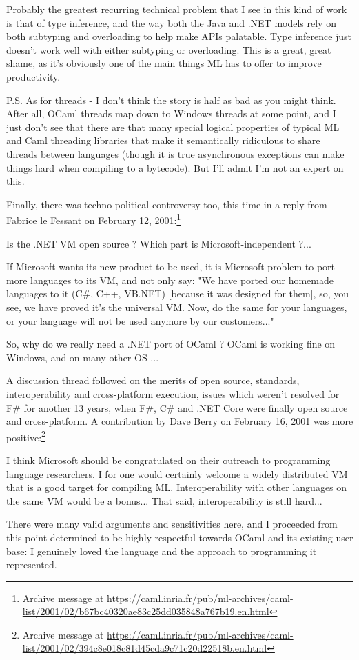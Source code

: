 \documentclass[acmsmall]{acmart}\settopmatter{}
\begin{document}
\begin{verbquote}
Probably the greatest recurring technical problem that I see in this kind of work is that of type inference, and the way both the Java and .NET models rely on both subtyping and overloading to help make APIs palatable.  Type inference just doesn't work well with either subtyping or overloading.  This is a great, great shame, as it's obviously one of the main things ML has to offer to improve productivity.  

P.S. As for threads - I don't think the story is half as bad as you might think.  After all, OCaml threads map down to Windows threads at some point, and I just don't see that there are that many special logical properties of typical ML and Caml threading libraries that make it semantically ridiculous to share threads between languages (though it is true asynchronous exceptions can make things hard when compiling to a bytecode).  But I'll admit I'm not an expert on this. 
\end{verbquote}
Finally, there was techno-political controversy too, this time in a reply from Fabrice le Fessant on February 12, 2001:\footnote{Archive message at \url{https://caml.inria.fr/pub/ml-archives/caml-list/2001/02/b67bc40320ae83c25dd035848a767b19.en.html}}
\begin{verbquote}
Is the .NET VM open source ? Which part is Microsoft-independent ?...

If Microsoft wants its new product to be used, it is Microsoft problem to port more languages to its VM, and not only say: "We have ported our homemade languages to it (C\#, C++, VB.NET) [because it was designed for them], so, you see, we have proved it's the universal VM. Now, do the same for your languages, or your language will not be used anymore by our customers..."

So, why do we really need a .NET port of OCaml ? OCaml is working fine on Windows, and on many other OS ... 
\end{verbquote}
A discussion thread followed on the merits of open source, standards, interoperability and cross-platform execution, issues which weren’t resolved for F\# for another 13 years, when F\#, C\# and .NET Core were finally open source and cross-platform.  A contribution by Dave Berry on February 16, 2001 was more positive:\footnote{Archive message at \url{https://caml.inria.fr/pub/ml-archives/caml-list/2001/02/394c8e018c81d45cda9c71c20d22518b.en.html}}
\begin{verbquote}
I think Microsoft should be congratulated on their outreach to programming language researchers.  I for one would certainly welcome a widely distributed VM that is a good target for compiling ML.  Interoperability with other languages on the same VM would be a bonus... That said, interoperability is still hard...
\end{verbquote}
There were many valid arguments and sensitivities here, and I proceeded from this point determined to be highly respectful towards OCaml and its existing user base: I genuinely loved the language and the approach to programming it represented. 
\end{document}

